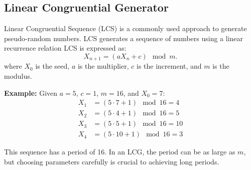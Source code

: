 	\subsection{Linear Congruential Generator}
	
	Linear Congruential Sequence (LCS) is a commonly used approach to generate
	pseudo-random numbers. LCS generates a sequence of numbers using a linear
	recurrence relation LCS is expressed as:
	\begin{equation}
		X_{n+1} = (aX_n + c) \mod m.
	\end{equation}
	where $X_0$ is the seed, $a$ is the multiplier, $c$ is the increment, and $m$ is the modulus.
	
	\textbf{Example:} Given $a = 5$, $c = 1$, $m = 16$, and $X_0 = 7$:
	\begin{align*}
		X_1 &= (5 \cdot 7 + 1) \mod 16 = 4 \\
		X_2 &= (5 \cdot 4 + 1) \mod 16 = 5 \\
		X_3 &= (5 \cdot 5 + 1) \mod 16 = 10 \\
		X_4 &= (5 \cdot 10 + 1) \mod 16 = 3
	\end{align*}
	
	This sequence has a period of 16. In an LCG, the period can be as large as $m$, but choosing parameters carefully is crucial to achieving long periods.
